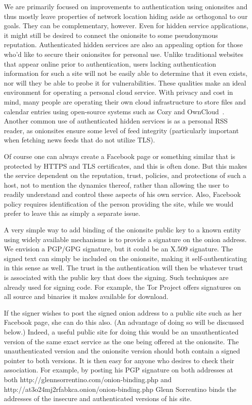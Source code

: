 \documentclass[10pt, conference, compsocconf]{styles/IEEEtran}
\begin{document}
We are primarily focused on improvements to authentication using
onionsites and thus mostly leave properties of network location hiding
aside as orthogonal to our goals. They can be complementary, however.
Even for hidden service applications, it might still be desired to
connect the onionsite to some pseudonymous reputation.  Authenticated
hidden services are also an appealing option for those who'd like to
secure their onionsites for personal use.  Unlike traditional websites
that appear online prior to authentication, users lacking
authentication information for such a site will not be easily able to
determine that it even exists, nor will they be able to probe it for
vulnerabilities.  These qualities make an ideal environment for
operating a personal cloud service.  With privacy and cost in mind,
many people are operating their own cloud infrastructure to store
files and calendar entries using open-source systems such as Cozy and
OwnCloud~\cite{cozy}.  Another common use of authenticated hidden
services is as a personal RSS reader, as onionsites ensure some level
of feed integrity (particularly important when fetching news feeds
that do not utilize TLS).

Of course one can always create a Facebook page or something similar
that is protected by HTTPS and TLS certificates,
and this is often done.  But this makes the service dependent on the
reputation, trust, policies, and protections of such a host, not to mention
the dynamics thereof, rather than allowing the user to readily understand
and control these aspects of his own service. Also, Facebook
policy requires identification of the person providing the site,
while we would prefer to leave this as simply a separate issue.

A very simple way to add binding of the onionsite public key to
a known entity using widely available mechanisms is to provide a
signature on the onion address. We envision a PGP/GPG signature, but
it could be an X.509 signature. The signed text can simply be
included on the onionsite, making it self-authenticating in this sense
as well. The trust in the authentication will then be whatever trust
is associated with the public key that does the signing. Such
techniques are already used for signing code. For example,
the Tor Project offers signatures on all source and binaries
it makes available for download. 

If the signer wishes to post the signed onion address to a public site
such as her Facebook page, she can do this also. (An advantage of
doing so will be discussed below.) Indeed, a useful public site for
doing this would be an unauthenticated version of the same exact
service as the one being offered at the onionsite.  The
unauthenticated version and the onionsite version should both contain
a signed pointer to both versions. It is then easy for anyone who
desires to check their association.  For example, by posting his PGP
signature on both addresses at both
http://glennsorrentino.com/onion-binding.php and
http://at3o24mj2rfabkca.onion/onion-binding.php Glenn Sorrentino binds
the addresses of the insecure and authenticated versions of his site.
\end{document}
